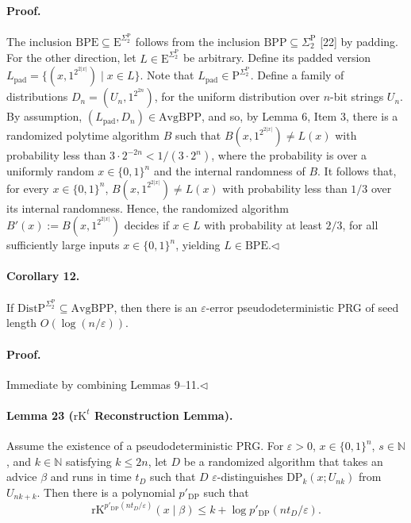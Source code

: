 \paragraph{Proof.} The inclusion $\mathrm{BPE}\subseteq\mathrm E^{\Sigma_2^{\mathrm P}}$ follows from the inclusion $\mathrm{BPP}\subseteq\Sigma_2^{\mathrm P}$ [22] by padding. For the other direction, let $L\in\mathrm E^{\Sigma_2^{\mathrm P}}$ be arbitrary. Define its padded version $L_{\mathrm{pad}}=\{(x,1^{2^{2|x|}})\mid x\in L\}$. Note that $L_{\mathrm{pad}}\in\mathrm P^{\Sigma_2^{\mathrm P}}$. Define a family of distributions $D_n=(U_n,1^{2^{2n}})$, for the uniform distribution over $n$-bit strings $U_n$. By assumption, $(L_{\mathrm{pad}},D_n)\in\mathrm{AvgBPP}$, and so, by Lemma 6, Item 3, there is a randomized polytime algorithm $B$ such that $B(x,1^{2^{2|x|}})\neq L(x)$ with probability less than $3\cdot2^{-2n}<1/(3\cdot2^n)$, where the probability is over a uniformly random $x\in\{0,1\}^n$ and the internal randomness of $B$. It follows that, for every $x\in\{0,1\}^n$, $B(x,1^{2^{2|x|}})\neq L(x)$ with probability less than $1/3$ over its internal randomness. Hence, the randomized algorithm $B'(x):=B(x,1^{2^{2|x|}})$ decides if $x\in L$ with probability at least $2/3$, for all sufficiently large inputs $x\in\{0,1\}^n$, yielding $L\in\mathrm{BPE}$.\hfill$\triangleleft$
\paragraph{Corollary 12.} If $\mathrm{DistP}^{\Sigma_2^{\mathrm P}}\subseteq\mathrm{AvgBPP}$, then there is an $\varepsilon$-error pseudodeterministic PRG of seed length $O(\log(n/\varepsilon))$.
\paragraph{Proof.} Immediate by combining Lemmas 9–11.\hfill$\triangleleft$
\paragraph{Lemma 23 ($\mathrm{rK}^t$ Reconstruction Lemma).} Assume the existence of a pseudodeterministic PRG. For $\varepsilon>0$, $x\in\{0,1\}^n$, $s\in\mathbb N$, and $k\in\mathbb N$ satisfying $k\leq2n$, let $D$ be a randomized algorithm that takes an advice $\beta$ and runs in time $t_D$ such that $D$ $\varepsilon$-distinguishes $\mathrm{DP}_k(x;U_{nk})$ from $U_{nk+k}$. Then there is a polynomial $p'_{\mathrm{DP}}$ such that
\[\mathrm{rK}^{p'_{\mathrm{DP}}(nt_D/\varepsilon)}(x\mid\beta)\leq k+\log p'_{\mathrm{DP}}(nt_D/\varepsilon).\]
